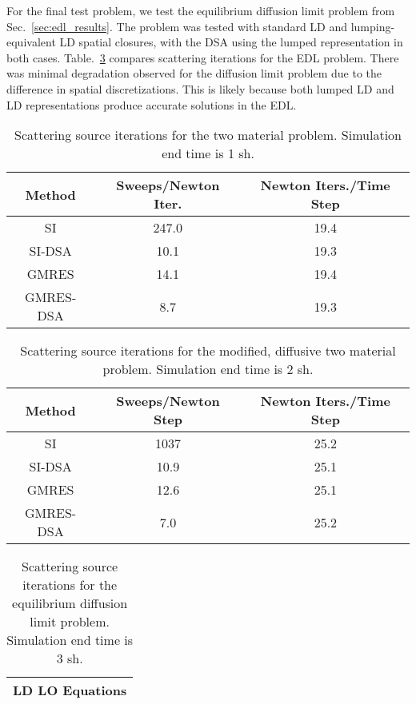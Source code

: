 {For the final test problem, we test the equilibrium diffusion limit problem from
Sec.~\ref{sec:edl_results}.  The problem was tested with standard LD and
lumping-equivalent LD spatial closures, with the DSA using the lumped representation in
both cases.  Table.~\ref{tab:edl_iters} compares scattering iterations for the EDL
problem.  There was minimal
degradation observed for the diffusion limit problem due to the difference in spatial
discretizations.  This is likely because both lumped LD and
LD representations produce accurate solutions in the EDL. 
\begin{table}[p]
    \centering
    \caption{\label{tab:twomat_dsa_iters} Scattering source iterations for the two
material problem.  Simulation end time is 1 sh.}
    \begin{tabular}{|ccc|} \hline
        Method & Sweeps/Newton Iter. & Newton Iters./Time Step \\ \hline
        SI     & 247.0 & 19.4                \\
        SI-DSA & 10.1   & 19.3      \\
        GMRES  & 14.1    &  19.4     \\
        GMRES-DSA & 8.7  &  19.3  \\ \hline
    \end{tabular}
\end{table}
\begin{table}[p]
    \centering
    \caption{\label{tab:twomat_hard_dsa_iters} Scattering source iterations for the
    modified, diffusive two material problem. Simulation end time is 2 sh.}
    \begin{tabular}{|ccc|} \hline
        Method & Sweeps/Newton Step & Newton Iters./Time Step \\ \hline
        SI        & 1037   &  25.2    \\
        SI-DSA    & 10.9   &  25.1   \\
        GMRES     & 12.6   &  25.1   \\
        GMRES-DSA & 7.0    &  25.2   \\ \hline
    \end{tabular}
\end{table}
\begin{table}[p]
    \centering
    \caption{\label{tab:edl_iters} Scattering source iterations for the equilibrium
    diffusion limit problem.  Simulation end time is 3 sh.}
    \begin{tabular}{|ccc|} \hline
        \multicolumn{3}{|c|}{LD LO Equations} \\ \hline

\end{tabular}
\end{table}}
